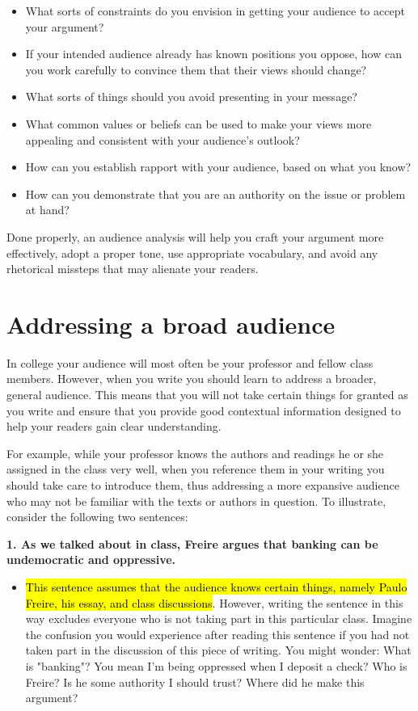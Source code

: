 \begin{itemize}

\item What sorts of constraints do you envision in getting your audience to accept your
argument? 
\item If your intended audience already has known positions you
oppose, how can you work carefully to convince them that their views should
change? 
\item What sorts of things should you avoid presenting in your message?
\item What common values or beliefs can be used to make your views more
appealing and consistent with your audience's outlook? 
\item How can you establish rapport with your audience, based on what you know? 
\item How can you demonstrate that you are an authority on the issue or problem at hand?

\end{itemize}

\noindent Done properly, an audience analysis will help you craft your argument
more effectively, adopt a proper tone, use appropriate vocabulary, and avoid
any rhetorical missteps that may alienate your readers.

 \section{Addressing a broad audience}

In college your audience will most often be your professor and fellow class
members. However, when you write you should learn to address a broader, general audience.
This means that you will not take certain things for granted as you write and ensure
that you provide good contextual information designed to help your readers gain clear understanding. 

For example, while your professor knows the authors and readings he or she assigned in the class
very well, when you reference them in your writing you should take care to
introduce them, thus addressing a more expansive audience who may not
be familiar with the texts or authors in question. To illustrate, consider the following two
sentences:

\newpage

\textbf{1. As we talked about in class, Freire argues that banking can be undemocratic and oppressive.}

\begin{itemize} \item \hl{This sentence assumes that the audience knows
certain things, namely Paulo Freire, his essay, and class discussions}. However,
writing the sentence in this way excludes everyone who is not taking part in
this particular class. Imagine the confusion you would experience after reading
this sentence if you had not taken part in the discussion of this piece of
writing. You might wonder: What is "banking"? You mean I'm being oppressed when
I deposit a check? Who is Freire? Is he some authority I should trust? Where did
he make this argument?
\end{itemize}

